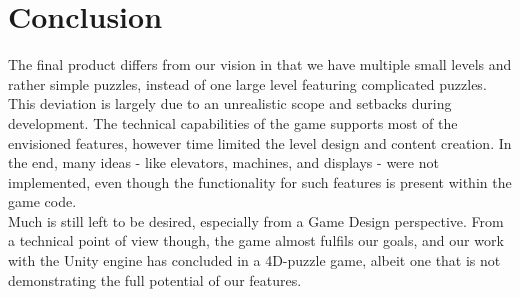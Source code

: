 \section{Conclusion}
The final product differs from our vision in that we have multiple small levels and rather simple puzzles, instead of one large level featuring complicated puzzles. This deviation is largely due to an unrealistic scope and setbacks during development. The technical capabilities of the game supports most of the envisioned features, however time limited the level design and content creation. In the end, many ideas - like elevators, machines, and displays - were not implemented, even though the functionality for such features is present within the game code.\\

Much is still left to be desired, especially from a Game Design perspective. From a technical point of view though, the game almost fulfils our goals, and our work with the Unity engine has concluded in a 4D-puzzle game, albeit one that is not demonstrating the full potential of our features.
 